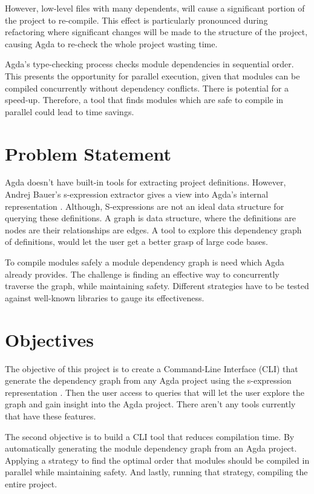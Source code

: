 However, low-level files with many dependents, will cause a significant portion
of the project to re-compile. This effect is particularly pronounced during
refactoring where significant changes will be made to the structure of the
project, causing Agda to re-check the whole project wasting time. 

Agda's type-checking process checks module dependencies in sequential order.
This presents the opportunity for parallel execution, given that modules can be
compiled concurrently without dependency conflicts. There is potential for a
speed-up. Therefore, a tool that finds modules which are safe to compile in
parallel could lead to time savings.

\section{Problem Statement}

Agda doesn't have built-in tools for extracting project definitions. However,
Andrej Bauer's s-expression extractor gives a view into Agda's internal
representation \cite{andrej}. Although, S-expressions are not an ideal data
structure for querying these definitions. A graph is data structure, where the
definitions are nodes are their relationships are edges. A tool to explore this
dependency graph of definitions, would let the user get a better grasp of large
code bases.

To compile modules safely a module dependency graph is need which Agda already
provides. The challenge is finding an effective way to concurrently traverse
the graph, while maintaining safety. Different strategies have to be tested
against well-known libraries to gauge its effectiveness. 

\section{Objectives}

The objective of this project is to create a Command-Line Interface (CLI) that
generate the dependency graph from any Agda project using the s-expression
representation \cite{andrej}. Then the user access to queries that will let the
user explore the graph and gain insight into the Agda project. There aren't
any tools currently that have these features. 

The second objective is to build a CLI tool that reduces compilation time. By
automatically generating the module dependency graph from an Agda project.
Applying a strategy to find the optimal order that modules should be compiled
in parallel while maintaining safety. And lastly, running that strategy,
compiling the entire project.

